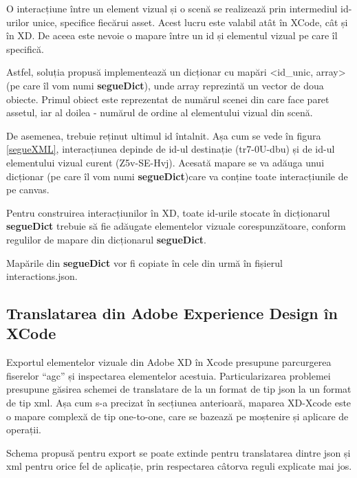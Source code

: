 

O interacțiune între un element vizual și o scenă se realizează prin intermediul id-urilor unice, specifice fiecărui asset. Acest lucru este valabil atât în XCode, cât și în XD. De aceea este nevoie o mapare între un id și elementul vizual pe care îl specifică. 

Astfel, soluția propusă implementează un dicționar cu mapări <id_unic, array> (pe care îl vom numi \textbf{segueDict}), unde array reprezintă un vector de doua obiecte. Primul obiect este reprezentat de numărul scenei din care face paret assetul, iar al doilea - numărul de ordine al elementului vizual din scenă.

De asemenea, trebuie reținut ultimul id întalnit. Așa cum se vede în figura \ref{segueXML}, interacțiunea depinde de id-ul destinație (tr7-0U-dbu) și de id-ul elementului vizual curent (Z5v-SE-Hvj). Acesată mapare se va adăuga unui dicționar (pe care îl vom numi \textbf{segueDict})care va conține toate interacțiunile de pe canvas.

Pentru construirea interacțiunilor în XD, toate id-urile stocate în dicționarul \textbf{segueDict} trebuie să fie adăugate elementelor vizuale corespunzătoare, conform regulilor de mapare din dicționarul \textbf{segueDict}.

Mapările din \textbf{segueDict} vor fi copiate în cele din urmă în fișierul interactions.json.

\subsection{Translatarea din Adobe Experience Design în XCode}


Exportul elementelor vizuale din Adobe XD în Xcode presupune parcurgerea fiserelor “agc”  și inspectarea elementelor acestuia. Particularizarea problemei presupune găsirea schemei de translatare de la un format de tip json la un format de tip xml. Așa cum s-a precizat în secțiunea anterioară, maparea XD-Xcode este o mapare complexă de tip one-to-one, care se bazează pe moștenire și  aplicare de operații. 

Schema propusă pentru export se poate extinde pentru translatarea dintre json și xml pentru orice fel de aplicație, prin respectarea câtorva reguli explicate mai jos. 

